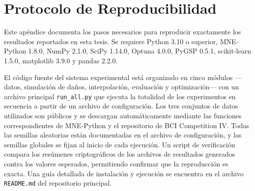 \chapter{Protocolo de Reproducibilidad}
\label{ap:reproducibilidad}

Este apéndice documenta los pasos necesarios para reproducir exactamente los resultados reportados en esta tesis. Se requiere Python 3.10 o superior, MNE-Python 1.8.0, NumPy 2.1.0, SciPy 1.14.0, Optuna 4.0.0, PyGSP 0.5.1, scikit-learn 1.5.0, matplotlib 3.9.0 y pandas 2.2.0.

El código fuente del sistema experimental está organizado en cinco módulos —datos, simulación de daños, interpolación, evaluación y optimización— con un archivo principal \texttt{run\_all.py} que ejecuta la totalidad de los experimentos en secuencia a partir de un archivo de configuración. Los tres conjuntos de datos utilizados son públicos y se descargan automáticamente mediante las funciones correspondientes de MNE-Python y el repositorio de BCI Competition IV. Todas las semillas aleatorias están documentadas en el archivo de configuración, y las semillas globales se fijan al inicio de cada ejecución. Un script de verificación compara los resúmenes criptográficos de los archivos de resultados generados contra los valores esperados, permitiendo confirmar que la reproducción es exacta. Una guía detallada de instalación y ejecución se encuentra en el archivo \texttt{README.md} del repositorio principal.